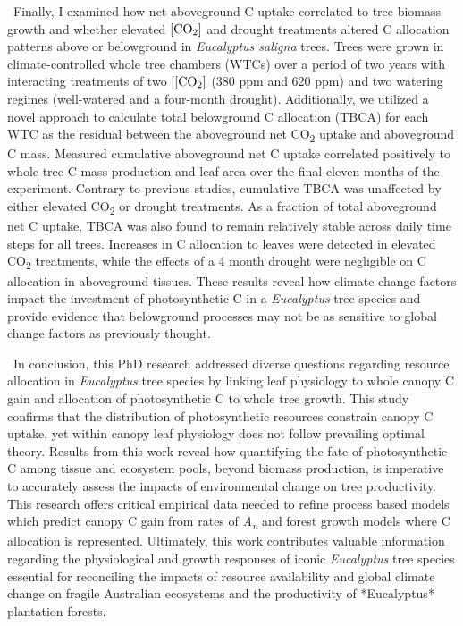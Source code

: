 \documentclass[a4paper]{article}
\begin{document}
\
Finally, I examined how net aboveground C uptake correlated to tree biomass growth and whether elevated $[\textrm{CO\textsubscript{2}}]$ and drought treatments altered C allocation patterns above or belowground in \textit{Eucalyptus saligna} trees. Trees were grown in climate-controlled whole tree chambers (WTCs) over a period of two years with interacting treatments of two [$[\textrm{CO\textsubscript{2}}]$ (380 ppm and 620 ppm) and two watering regimes (well-watered and a four-month drought). Additionally, we utilized a novel approach to calculate total belowground C allocation (TBCA) for each WTC as the residual between the aboveground net CO\textsubscript{2} uptake and aboveground C mass. Measured cumulative aboveground net C uptake correlated positively to whole tree C mass production and leaf area over the final eleven months of the experiment. Contrary to previous studies, cumulative TBCA was unaffected by either elevated CO\textsubscript{2} or drought treatments. As a fraction of total aboveground net C uptake, TBCA was also found to remain relatively stable across daily time steps for all trees. Increases in C allocation to leaves were detected in elevated CO\textsubscript{2} treatments, while the effects of a 4 month drought were negligible on C allocation in aboveground tissues.  These results reveal how climate change factors impact the investment of photosynthetic C in a \textit{Eucalyptus} tree species and provide evidence that belowground processes may not be as sensitive to global change factors as previously thought. 

\
In conclusion, this PhD research addressed diverse questions regarding resource allocation in \textit{Eucalyptus} tree species by linking leaf physiology to whole canopy C gain and allocation of photosynthetic C to whole tree growth. This study confirms that the distribution of photosynthetic resources constrain canopy C uptake, yet within canopy leaf physiology does not follow prevailing optimal theory. Results from this work reveal how quantifying the fate of photosynthetic C among tissue and ecosystem pools, beyond biomass production, is imperative to accurately assess the impacts of environmental change on tree productivity. This research offers critical empirical data needed to refine process based models which predict canopy C gain from rates of \textit{A\textsubscript{n}} and forest growth models where C allocation is represented. Ultimately, this work contributes valuable information regarding the physiological and growth responses of iconic \textit{Eucalyptus} tree species essential for reconciling the impacts of resource availability and global climate change on fragile Australian ecosystems and the productivity of *Eucalyptus* plantation forests. 
\end{document}
